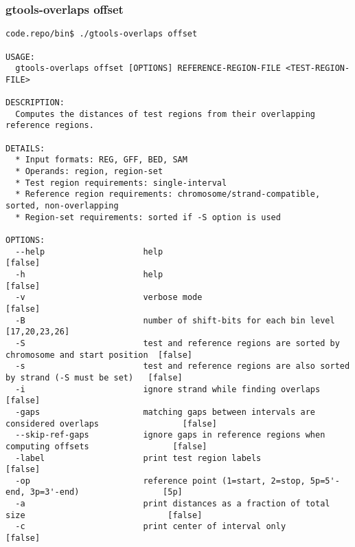 \subsubsection{gtools-overlaps offset}\label{gtools-overlaps_offset}
\begin{lstlisting}
code.repo/bin$ ./gtools-overlaps offset

USAGE:
  gtools-overlaps offset [OPTIONS] REFERENCE-REGION-FILE <TEST-REGION-FILE>

DESCRIPTION:
  Computes the distances of test regions from their overlapping reference regions.

DETAILS:
  * Input formats: REG, GFF, BED, SAM
  * Operands: region, region-set
  * Test region requirements: single-interval
  * Reference region requirements: chromosome/strand-compatible, sorted, non-overlapping
  * Region-set requirements: sorted if -S option is used

OPTIONS:
  --help                    help                                                                    [false]
  -h                        help                                                                    [false]
  -v                        verbose mode                                                            [false]
  -B                        number of shift-bits for each bin level                                 [17,20,23,26]
  -S                        test and reference regions are sorted by chromosome and start position  [false]
  -s                        test and reference regions are also sorted by strand (-S must be set)   [false]
  -i                        ignore strand while finding overlaps                                    [false]
  -gaps                     matching gaps between intervals are considered overlaps                 [false]
  --skip-ref-gaps           ignore gaps in reference regions when computing offsets                 [false]
  -label                    print test region labels                                                [false]
  -op                       reference point (1=start, 2=stop, 5p=5'-end, 3p=3'-end)                 [5p]
  -a                        print distances as a fraction of total size                             [false]
  -c                        print center of interval only                                           [false]
\end{lstlisting}
%
